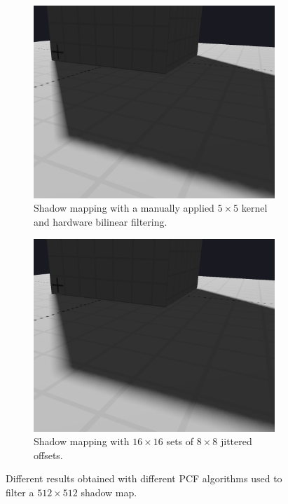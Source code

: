 \begin{figure}[t]
    \begin{subfigure}[t]{0.45\textwidth}
        \includegraphics[width=\textwidth]{./graf/PCF_manual_kernel_5x5_bilinear.png}
        \caption{Shadow mapping with a manually applied \(5\times 5\) kernel and hardware bilinear filtering.}
        \label{fig:pcf_manual_with_bilinear}
    \end{subfigure}
    \hfill
    \begin{subfigure}[t]{0.45\textwidth}
        \includegraphics[width=\textwidth]{./graf/PCF_random_kernel_16x16_8x8.png}
        \caption{Shadow mapping with \(16\times 16\) sets of \(8\times 8\) jittered offsets.}
        \label{fig:pcf_random}
    \end{subfigure}
        
    \caption{Different results obtained with different PCF algorithms used to filter a \(512\times 512\) shadow map.}
    \label{fig:pcf_methods_example}
\end{figure}

